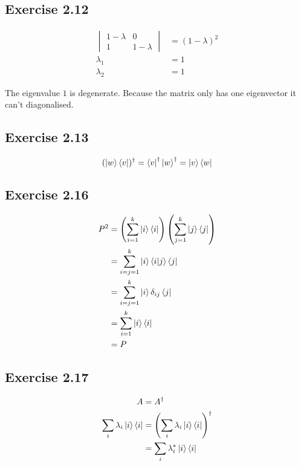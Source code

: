 \documentclass{article}
\begin{document}
\subsection*{Exercise 2.12}

\begin{align*}
  \begin{vmatrix}
    1 - \lambda & 0           \\
    1           & 1 - \lambda
  \end{vmatrix} & = (1 - \lambda)^2  \\
  \lambda_1                    & = 1 \\
  \lambda_2                    & = 1
\end{align*}

The eigenvalue $1$ is degenerate. Because the matrix only has one eigenvector it can't diagonalised.

\subsection*{Exercise 2.13}

\[(\ket{w} \bra{v})^\dag = \bra{v}^\dag \ket{w}^\dag = \ket{v} \bra{w}\]

\subsection*{Exercise 2.16}

\begin{align*}
  P^2 & = \left( \sum_{i = 1}^k \ket{i} \bra{i} \right) \left( \sum_{j = 1}^k \ket{j} \bra{j} \right) \\
      & = \sum_{i = j = 1}^k \ket{i} \braket{i | j} \bra{j}                                           \\
      & = \sum_{i = j = 1}^k \ket{i} \delta_{i j} \bra{j}                                             \\
      & = \sum_{i = 1}^k \ket{i} \bra{i}                                                              \\
      & = P
\end{align*}

\subsection*{Exercise 2.17}

\begin{align*}
  A                                & = A^\dag                                               \\
  \sum_i \lambda_i \ket{i} \bra{i} & = \left( \sum_i \lambda_i \ket{i} \bra{i} \right)^\dag \\
                                   & = \sum_i \lambda_i^* \ket{i} \bra{i}
\end{align*}
\end{document}
